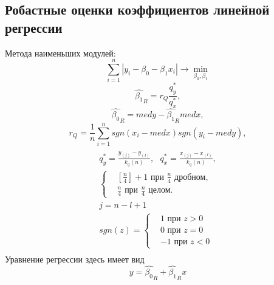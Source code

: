     \subsection{Робастные оценки коэффициентов линейной регрессии}
    Метода наименьших модулей:
    \begin{equation}
	    \sum_{i=1}^{n}{|y_{i} - \beta_{0} - \beta_{1}x_{i}|}\rightarrow \min_{\beta_{0}, \beta_{1}}
	    \label{min_abs}
	\end{equation}
    \begin{equation}
        \hat{\beta_{1}}_{R} = r_{Q}\frac{q^{*}_{y}}{q^{*}_{x}},
        \label{b_1R}
    \end{equation}
    \begin{equation}
        \hat{\beta_{0}}_{R} = med y - \hat{\beta_{1}}_{R} med x,
        \label{b_0R}
    \end{equation}
    \begin{equation}
        r_{Q} = \frac{1}{n}\sum_{i=1}^{n}{sgn(x_{i} - med x)sgn(y_{i} - med y)},
        \label{r_Q}
    \end{equation}
    \begin{multline}
    \\
        q^{*}_{y} = \frac{y_{(j)} -y_{(l)}}{k_{q}(n)},~~~
        q^{*}_{x} = \frac{x_{(j)} - x_{(l)}}{k_{q}(n)}, \\
        \begin{cases}
             & [\frac{n}{4}] + 1 \text{ при } \frac{n}{4} \text{ дробном, } \\
             & \frac{n}{4} \text{ при } \frac{n}{4} \text{ целом. }
        \end{cases}\\
        j = n - l + 1\\
        sgn(z) = \begin{cases}
                    & 1 \text{ при } z > 0 \\
                    & 0 \text{ при } z = 0 \\
                    & -1 \text{ при } z < 0
                 \end{cases}\\
        \label{q*}
    \end{multline}
    Уравнение регрессии здесь имеет вид
    \begin{equation}
        y = \hat{\beta_{0}}_{R} +  \hat{\beta_{1}}_{R}x
        \label{y}
    \end{equation}
